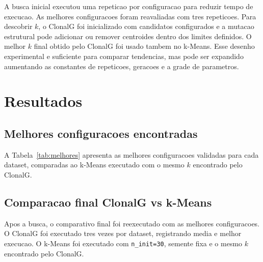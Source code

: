 \documentclass[12pt,a4paper]{article}
\begin{document}
A busca inicial executou uma repeticao por configuracao para reduzir tempo de execucao. As melhores configuracoes foram reavaliadas com tres repeticoes. Para descobrir \(k\), o ClonalG foi inicializado com candidatos configurados e a mutacao estrutural pode adicionar ou remover centroides dentro dos limites definidos. O melhor \(k\) final obtido pelo ClonalG foi usado tambem no k-Means. Esse desenho experimental e suficiente para comparar tendencias, mas pode ser expandido aumentando as constantes de repeticoes, geracoes e a grade de parametros.

\section{Resultados}

\subsection{Melhores configuracoes encontradas}
A Tabela~\ref{tab:melhores} apresenta as melhores configuracoes validadas para cada dataset, comparadas ao k-Means executado com o mesmo \(k\) encontrado pelo ClonalG.

\begin{table}[H]
\centering
\caption{Melhores configuracoes validadas do ClonalG e comparacao com k-Means.}
\label{tab:melhores}
\end{table}

\subsection{Comparacao final ClonalG vs k-Means}
Apos a busca, o comparativo final foi reexecutado com as melhores configuracoes. O ClonalG foi executado tres vezes por dataset, registrando media e melhor execucao. O k-Means foi executado com \texttt{n\_init=30}, semente fixa e o mesmo \(k\) encontrado pelo ClonalG.
\end{document}
